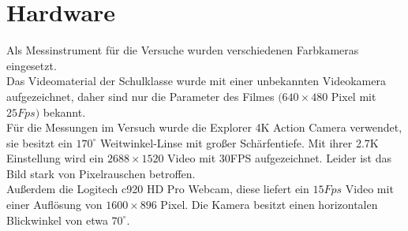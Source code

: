 \section{Hardware}
\label{hardware}
Als Messinstrument für die Versuche wurden verschiedenen Farbkameras eingesetzt.\\
Das Videomaterial der Schulklasse wurde mit einer unbekannten Videokamera aufgezeichnet, daher sind nur die Parameter des Filmes $(640 \times 480$ Pixel mit $25Fps)$ bekannt.\\
Für die Messungen im Versuch wurde die Explorer 4K Action Camera verwendet, sie besitzt ein $170^\circ$ Weitwinkel-Linse mit großer Schärfentiefe. Mit ihrer 2.7K Einstellung wird ein $2688 \times 1520$ Video mit 30FPS aufgezeichnet. Leider ist das Bild stark von Pixelrauschen betroffen.\\
Außerdem die Logitech c920 HD Pro Webcam, diese liefert ein $15Fps$ Video mit einer Auflösung von $1600\times 896$ Pixel. Die Kamera besitzt einen horizontalen Blickwinkel von etwa $70^\circ$.

